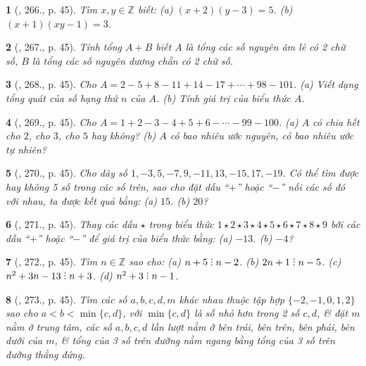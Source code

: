 \documentclass{article}
\newtheorem{baitoan}{}
\DeclareRobustCommand{\divby}{%
	\mathrel{\vbox{\baselineskip.65ex\lineskiplimit0pt\hbox{.}\hbox{.}\hbox{.}}}%
}
\begin{document}
\begin{baitoan}[\cite{Binh_Toan_6_tap_1}, 266., p. 45]
	Tìm $x,y\in\mathbb{Z}$ biết: (a) $(x + 2)(y - 3) = 5$. (b) $(x + 1)(xy - 1) = 3$.
\end{baitoan}

\begin{baitoan}[\cite{Binh_Toan_6_tap_1}, 267., p. 45]
	Tính tổng $A + B$ biết $A$ là tổng các số nguyên âm lẻ có 2 chữ số, $B$ là tổng các số nguyên dương chẵn có 2 chữ số.
\end{baitoan}

\begin{baitoan}[\cite{Binh_Toan_6_tap_1}, 268., p. 45]
	Cho $A = 2 - 5 + 8 - 11 + 14 - 17 + \cdots + 98 - 101$. (a) Viết dạng tổng quát của số hạng thứ $n$ của $A$. (b) Tính giá trị của biểu thức $A$.
\end{baitoan}

\begin{baitoan}[\cite{Binh_Toan_6_tap_1}, 269., p. 45]
	Cho $A = 1 + 2 - 3 - 4 + 5 + 6 - \cdots - 99 - 100$. (a) $A$ có chia hết cho $2$, cho $3$, cho $5$ hay không? (b) $A$ có bao nhiêu ước nguyên, có bao nhiêu ước tự nhiên?
\end{baitoan}

\begin{baitoan}[\cite{Binh_Toan_6_tap_1}, 270., p. 45]
	Cho dãy số $1,-3,5,-7,9,-11,13,-15,17,-19$. Có thể tìm được hay không 5 số trong các số trên, sao cho đặt dấu ``$+$'' hoặc ``$-$'' nối các số đó với nhau, ta được kết quả bằng: (a) $15$. (b) $20$?
\end{baitoan}

\begin{baitoan}[\cite{Binh_Toan_6_tap_1}, 271., p. 45]
	Thay các dấu  $\star$ trong biểu thức $1\star2\star3\star4\star5\star6\star7\star8\star9$ bởi các dấu ``$+$'' hoặc ``$-$'' để giá trị của biểu thức bằng: (a) $-13$. (b) $-4$?
\end{baitoan}

\begin{baitoan}[\cite{Binh_Toan_6_tap_1}, 272., p. 45]
	Tìm $n\in\mathbb{Z}$ sao cho: (a) $n + 5\divby n - 2$. (b) $2n + 1\divby n - 5$. (c) $n^2 + 3n - 13\divby n + 3$. (d) $n^2 + 3\divby n - 1$.
\end{baitoan}

\begin{baitoan}[\cite{Binh_Toan_6_tap_1}, 273., p. 45]
	Tìm các số $a,b,c,d,m$ khác nhau thuộc tập hợp $\{-2,-1,0,1,2\}$ sao cho $a < b < \min\{c,d\}$, với $\min\{c,d\}$ là số nhỏ hơn trong 2 số $c,d$, \& đặt $m$ nằm ở trung tâm, các số $a,b,c,d$ lần lượt nằm ở bên trái, bên trên, bên phải, bên dưới của $m$, \& tổng của 3 số trên đường nằm ngang bằng tổng của 3 số trên đường thẳng đứng.
\end{baitoan}
\end{document}
